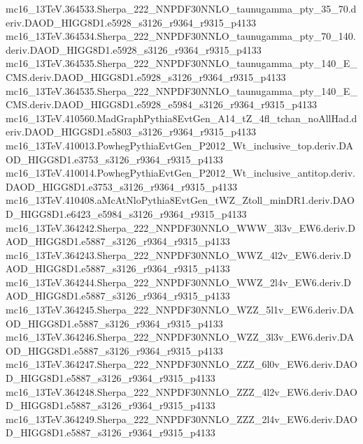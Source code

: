 \begin{footnotesize}
mc16\_13TeV.364533.Sherpa\_222\_NNPDF30NNLO\_taunugamma\_pty\_35\_70.deriv.DAOD\_HIGG8D1.e5928\_s3126\_r9364\_r9315\_p4133 \\
mc16\_13TeV.364534.Sherpa\_222\_NNPDF30NNLO\_taunugamma\_pty\_70\_140.deriv.DAOD\_HIGG8D1.e5928\_s3126\_r9364\_r9315\_p4133 \\
mc16\_13TeV.364535.Sherpa\_222\_NNPDF30NNLO\_taunugamma\_pty\_140\_E\_CMS.deriv.DAOD\_HIGG8D1.e5928\_s3126\_r9364\_r9315\_p4133 \\
mc16\_13TeV.364535.Sherpa\_222\_NNPDF30NNLO\_taunugamma\_pty\_140\_E\_CMS.deriv.DAOD\_HIGG8D1.e5928\_e5984\_s3126\_r9364\_r9315\_p4133 \\
mc16\_13TeV.410560.MadGraphPythia8EvtGen\_A14\_tZ\_4fl\_tchan\_noAllHad.deriv.DAOD\_HIGG8D1.e5803\_s3126\_r9364\_r9315\_p4133 \\
mc16\_13TeV.410013.PowhegPythiaEvtGen\_P2012\_Wt\_inclusive\_top.deriv.DAOD\_HIGG8D1.e3753\_s3126\_r9364\_r9315\_p4133 \\
mc16\_13TeV.410014.PowhegPythiaEvtGen\_P2012\_Wt\_inclusive\_antitop.deriv.DAOD\_HIGG8D1.e3753\_s3126\_r9364\_r9315\_p4133 \\
mc16\_13TeV.410408.aMcAtNloPythia8EvtGen\_tWZ\_Ztoll\_minDR1.deriv.DAOD\_HIGG8D1.e6423\_e5984\_s3126\_r9364\_r9315\_p4133 \\
mc16\_13TeV.364242.Sherpa\_222\_NNPDF30NNLO\_WWW\_3l3v\_EW6.deriv.DAOD\_HIGG8D1.e5887\_s3126\_r9364\_r9315\_p4133 \\
mc16\_13TeV.364243.Sherpa\_222\_NNPDF30NNLO\_WWZ\_4l2v\_EW6.deriv.DAOD\_HIGG8D1.e5887\_s3126\_r9364\_r9315\_p4133 \\
mc16\_13TeV.364244.Sherpa\_222\_NNPDF30NNLO\_WWZ\_2l4v\_EW6.deriv.DAOD\_HIGG8D1.e5887\_s3126\_r9364\_r9315\_p4133 \\
mc16\_13TeV.364245.Sherpa\_222\_NNPDF30NNLO\_WZZ\_5l1v\_EW6.deriv.DAOD\_HIGG8D1.e5887\_s3126\_r9364\_r9315\_p4133 \\
mc16\_13TeV.364246.Sherpa\_222\_NNPDF30NNLO\_WZZ\_3l3v\_EW6.deriv.DAOD\_HIGG8D1.e5887\_s3126\_r9364\_r9315\_p4133 \\
mc16\_13TeV.364247.Sherpa\_222\_NNPDF30NNLO\_ZZZ\_6l0v\_EW6.deriv.DAOD\_HIGG8D1.e5887\_s3126\_r9364\_r9315\_p4133 \\
mc16\_13TeV.364248.Sherpa\_222\_NNPDF30NNLO\_ZZZ\_4l2v\_EW6.deriv.DAOD\_HIGG8D1.e5887\_s3126\_r9364\_r9315\_p4133 \\
mc16\_13TeV.364249.Sherpa\_222\_NNPDF30NNLO\_ZZZ\_2l4v\_EW6.deriv.DAOD\_HIGG8D1.e5887\_s3126\_r9364\_r9315\_p4133 \\

\end{footnotesize}
